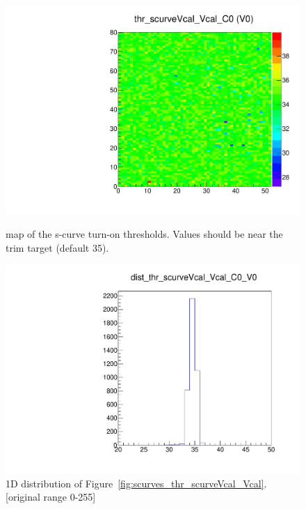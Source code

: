 \begin{figure}[!Hp]
\centering
\begin{minipage}{0.45\textwidth}
  \includegraphics[width=1.0\textwidth]{figures/scurves_thr_scurveVcal_Vcal.pdf}
  \caption{\roc map of the \vcal s-curve turn-on thresholds.
  Values should be near the trim target (default 35).}
  \label{fig:scurves_thr_scurveVcal_Vcal}
\end{minipage}
\hspace{0.3cm}
\begin{minipage}{0.45\textwidth}
  \includegraphics[width=1.0\textwidth]{figures/scurves_dist_thr_scurveVcal_Vcal.pdf}
  \caption{1D distribution of Figure~\ref{fig:scurves_thr_scurveVcal_Vcal}.
  [original range 0-255]}
  \label{fig:scurves_dist_thr_scurveVcal_Vcal}
\end{minipage}
\end{figure}


